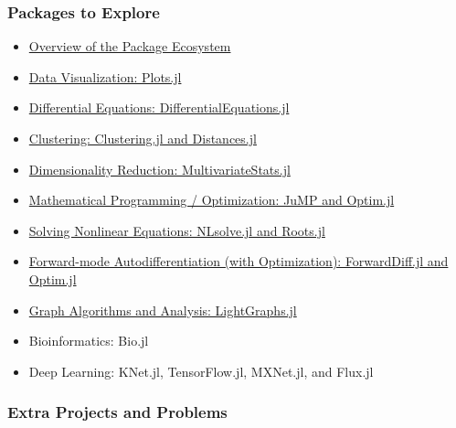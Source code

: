 \documentclass[11pt]{article}
\begin{document}
\subsubsection{Packages to Explore}\label{packages-to-explore}

\begin{itemize}
\itemsep1pt\parskip0pt
\item
  \href{http://ucidatascienceinitiative.github.io/IntroToJulia/Slides/PackageEcosystem}{Overview
  of the Package Ecosystem}
\item
  \href{http://ucidatascienceinitiative.github.io/IntroToJulia/Slides/PlotsJL}{Data
  Visualization: Plots.jl}
\item
  \href{http://ucidatascienceinitiative.github.io/IntroToJulia/Slides/DiffEq}{Differential
  Equations: DifferentialEquations.jl}
\item
  \href{http://ucidatascienceinitiative.github.io/IntroToJulia/Html/Clustering}{Clustering:
  Clustering.jl and Distances.jl}
\item
  \href{http://ucidatascienceinitiative.github.io/IntroToJulia/Html/DimensionalityReduction}{Dimensionality
  Reduction: MultivariateStats.jl}
\item
  \href{http://ucidatascienceinitiative.github.io/IntroToJulia/Slides/Optimization}{Mathematical
  Programming / Optimization: JuMP and Optim.jl}
\item
  \href{http://ucidatascienceinitiative.github.io/IntroToJulia/Slides/NonlinearSolve}{Solving
  Nonlinear Equations: NLsolve.jl and Roots.jl}
\item
  \href{http://ucidatascienceinitiative.github.io/IntroToJulia/Slides/ForwardDiff}{Forward-mode
  Autodifferentiation (with Optimization): ForwardDiff.jl and Optim.jl}
\item
  \href{http://ucidatascienceinitiative.github.io/IntroToJulia/Slides/Graphs}{Graph
  Algorithms and Analysis: LightGraphs.jl}
\item
  Bioinformatics: Bio.jl
\item
  Deep Learning: KNet.jl, TensorFlow.jl, MXNet.jl, and Flux.jl
\end{itemize}

\subsubsection{Extra Projects and
Problems}\label{extra-projects-and-problems}
\end{document}
